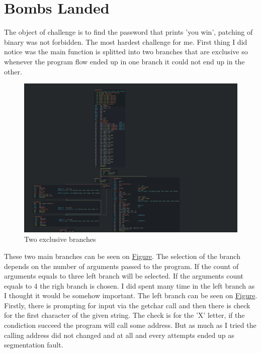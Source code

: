 \documentclass[11pt]{article}
\begin{document}
\section{Bombs Landed}
\label{sec:org4a4aed8}
The object of challenge is to find the password that prints 'you win', patching of binary was not forbidden. The most hardest challenge for me.
First thing I did notice was the main function is splitted into two branches that are exclusive so whenever the program flow ended up in one branch it could not end up in the other.
\begin{figure}[htbp]
\centering
\includegraphics[width=.9\linewidth]{bombs_landed_main_branches.png}
\caption{\label{fig-main-branches}Two exclusive branches}
\end{figure}
These two main branches can be seen on \hyperref[fig-main-branches]{Figure}.
The selection of the branch depends on the number of arguments passed to the program. If the count of arguments equals to three left branch will be selected. If the arguments count equals to 4 the righ branch is chosen.
I did spent many time in the left branch as I thought it would be somehow important. The left branch can be seen on \hyperref[fig-left-branch]{Figure}. Firstly, there is prompting for input via the getchar call and then there is check for the first character of the given string. The check is for the 'X' letter, if the condiction succeed the program will call some address. But as much as I tried the calling address did not changed and at all and every attempts ended up as segmentation fault.
\end{document}
